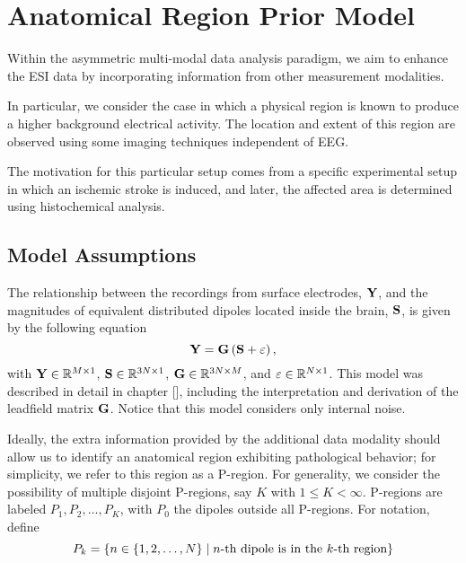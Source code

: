 \chapter{Anatomical Region Prior Model}
%

%
%

Within the asymmetric multi-modal data analysis paradigm, we aim to enhance the ESI data by incorporating information from other measurement modalities.

In particular, we consider the case in which a physical region is known to produce a higher background electrical activity.
%
The location and extent of this region are observed using some imaging techniques independent of EEG.

The motivation for this particular setup comes from a specific experimental setup in which an ischemic stroke is induced, and later, the affected area is determined using histochemical analysis.

\section{Model Assumptions}

The relationship between the recordings from surface electrodes, $\mathbf{Y}$, and the magnitudes of equivalent distributed dipoles located inside the brain, $\mathbf{S}$, is given by the following equation
\begin{equation}
\mathbf{Y} = \mathbf{G} \left( \mathbf{S} + \varepsilon \right),
\label{eq:3.1}
\end{equation}
with $\mathbf{Y} \in \mathbb{R}^{M \times 1}$, $\mathbf{S} \in \mathbb{R}^{3N \times 1}$, $\mathbf{G} \in \mathbb{R}^{3N\times M}$, and $\varepsilon\in \mathbb{R}^{N\times 1}$.
%
This model was described in detail in chapter [], including the interpretation and derivation of the leadfield matrix $\mathbf{G}$.
%
Notice that this model considers only internal noise.

Ideally, the extra information provided by the additional data modality should allow us to identify an anatomical region exhibiting pathological behavior; for simplicity, we refer to this region as a P-region. 
%
For generality, we consider the possibility of multiple disjoint P-regions, say $K$ with $1\leq K < \infty$.
%
P-regions are labeled $P_1, P_2, \dots, P_K$, with $P_0$ the dipoles outside all P-regions.
%
For notation, define 
\begin{equation}
    P_k = \left\{  n\in \left\{ 1, 2, \dots, N \right\} \;\middle|\; n\text{-th dipole is in the } k\text{-th region}  \right\}
\end{equation}

